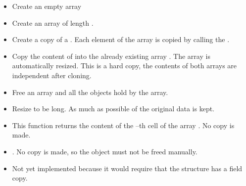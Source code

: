 \begin{itemize}
\item {}
  \sshortdescribe Create an empty array
\item {}
  \sshortdescribe Create an array of length .
\item {}
  \sshortdescribe Create a copy of a . Each element of the
  array  is copied by calling the .
\item {}
  \sshortdescribe Copy the content of  into the already existing
  array . The array  is automatically resized. This is a
  hard copy, the contents of both arrays are independent after cloning.
\item {}
  \sshortdescribe Free an array and all the objects hold by the array.
\item {}
  \sshortdescribe Resize  to be  long. As much as possible of
  the original data is kept.
\item {}
  \sshortdescribe This function returns the content of the --th cell of
  the array . No copy is made.
\item {}
  \sshortdescribe {}. No copy is made, so the object  must
  not be freed manually.
\item {}
  \sshortdescribe Not yet implemented because it would require that the
  structure  has a field copy.
\end{itemize}


